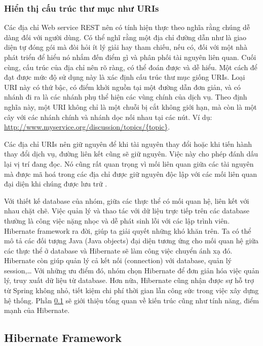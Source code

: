 \documentclass[12pt,a4paper,oneside]{extbook}
\begin{document}
\subsubsection{Hiển thị cấu trúc thư mục như URIs}

Các địa chỉ Web service REST nên có tính hiện thực theo nghĩa rằng chúng dễ dàng đối với người dùng. Có thể nghĩ rằng một địa chỉ đường dẫn như là giao diện tự đóng gói mà đòi hỏi ít lý giải hay tham chiếu, nếu có, đối với một nhà phát triển để hiểu nó nhắm đến điểm gì và phân phối tài nguyên liên quan. Cuối cùng, cấu trúc của địa chỉ nên rõ ràng, có thể đoán được và dễ hiểu.
Một cách để đạt được mức độ sử dụng này là xác định cấu trúc thư mục giống URIs. Loại URI này có thứ bậc, có điểm khởi nguồn tại một đường dẫn đơn giản, và có nhánh đi ra là các nhánh phụ thể hiện các vùng chính của dịch vụ. Theo định nghĩa này, một URI không chỉ là một chuỗi bị cắt không giới hạn, mà còn là một cây với các nhánh chính và nhánh dọc nối nhau tại các nút. Ví dụ: \url{http://www.myservice.org/discussion/topics/{topic}}.

Các địa chỉ URIs nên giữ nguyên để khi tài nguyên thay đổi hoặc khi tiến hành thay đổi dịch vụ, đường liên kết cũng sẽ giữ nguyên. Việc này cho phép đánh dấu lại vị trí đang đọc. Nó cũng rất quan trọng vì mối liên quan giữa các tài nguyên mà được mã hoá trong các địa chỉ được giữ nguyên độc lập với các mối liên quan đại diện khi chúng được lưu trữ \cite{restful-basic}.

Với thiết kế database của nhóm, giữa các thực thể có mối quan hệ, liên kết với nhau chặt chẽ. Việc quản lý và thao tác với dữ liệu trực tiếp trên các database thường là công việc nặng nhọc và dễ phát sinh lỗi với các lập trình viên. Hibernate framework ra đời, giúp ta giải quyết những khó khăn trên. Ta có thể mô tả các đối tượng Java (Java objects) đại diện tương ứng cho mối quan hệ giữa các thực thể ở database và Hibernate sẽ làm công việc chuyển ánh xạ đó. Hibernate còn giúp quản lý cả kết nối (connection) với database, quản lý session,\dots\hspace{0mm} Với những ưu điểm đó, nhóm chọn Hibernate để đơn giản hóa việc quản lý, truy xuất dữ liệu từ database. Hơn nữa, Hibernate cũng nhận được sự hỗ trợ từ Spring không nhỏ, tiết kiệm chi phí thời gian lẫn công sức trong việc xây dựng hệ thống. Phần \ref{hibernate} sẽ giới thiệu tổng quan về kiến trúc cũng như tính năng, điểm mạnh của Hibernate.

\subsection{Hibernate Framework}\label{hibernate}
\end{document}
